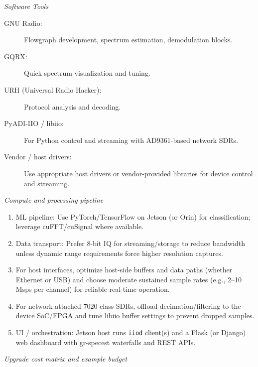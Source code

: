\documentclass[11pt]{report}
\newcommand{\gc}[1]{\textcolor[rgb]{1.00,0.00,0.00}{#1}} %
\begin{document}
\begin{description}
\bigskip

\textit{Software Tools}

\begin{description}
    \item[GNU Radio:] Flowgraph development, spectrum estimation, demodulation blocks.
    \item[GQRX:] Quick spectrum visualization and tuning.
    \item[URH (Universal Radio Hacker):] Protocol analysis and decoding.
    \item[PyADI-IIO / libiio:] For Python control and streaming with AD9361-based network SDRs.
    \item[Vendor / host drivers:] Use appropriate host drivers or vendor-provided libraries for device control and streaming.
\end{description}

\bigskip

\emph{Compute and processing pipeline}

\begin{enumerate}[leftmargin=*,label={\arabic*.}]
    \item \gc{ML pipeline:} Use PyTorch/TensorFlow on Jetson (or Orin) for classification; leverage cuFFT/cuSignal where available.
    \item \gc{Data transport:} Prefer 8-bit IQ for streaming/storage to reduce bandwidth unless dynamic range requirements force higher resolution captures.
    \item For host interfaces, optimize host-side buffers and data paths (whether Ethernet or USB) and choose moderate sustained sample rates (e.g., 2--10\,Msps per channel) for reliable real-time operation.
    \item For network-attached 7020-class SDRs, offload decimation/filtering to the device SoC/FPGA and tune libiio buffer settings to prevent dropped samples.
    \item \gc{UI / orchestration:} Jetson host runs \texttt{iiod} client(s) and a Flask (or Django) web dashboard with gr-specest waterfalls and REST APIs.
\end{enumerate}

\bigskip

\emph{Upgrade cost matrix and example budget}


\end{description}
\end{document}
